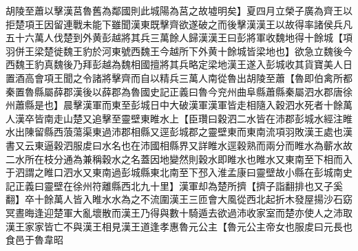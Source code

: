 胡陵至蕭以擊漢莒魯舊為鄰國則此城陽為莒之故墟明矣】夏四月立榮子廣為齊王以拒楚項王因留連戰未能下雖聞漢東既擊齊欲遂破之而後擊漢漢王以故得率諸侯兵凡五十六萬人伐楚到外黄彭越將其兵三萬餘人歸漢漢王曰彭將軍收魏地得十餘城【項羽併王梁楚徙魏王豹於河東號西魏王今越所下外黄十餘城皆梁地也】欲急立魏後今西魏王豹真魏後乃拜彭越為魏相國擅將其兵略定梁地漢王遂入彭城收其貨寶美人日置酒高會項王聞之令諸將擊齊而自以精兵三萬人南從魯出胡陵至蕭【魯即伯禽所都秦置魯縣屬薛郡漢後以薛郡為魯國史記正義曰魯今兖州曲阜縣蕭縣秦屬泗水郡唐徐州蕭縣是也】晨擊漢軍而東至彭城日中大破漢軍漢軍皆走相隨入穀泗水死者十餘萬人漢卒皆南走山楚又追擊至靈壁東睢水上【臣瓚曰穀泗二水皆在沛郡彭城水經注睢水出陳留縣西蒗蕩渠東過沛郡相縣又逕彭城郡之靈壁東而東南流項羽敗漢王處也漢書又云東逼穀泗服䖍曰水名也在沛國相縣界又詳睢水逕穀熟而兩分而睢水為蘄水故二水所在枝分通為兼稱穀水之名蓋因地變然則穀水即睢水也睢水又東南至下相而入于泗謂之睢口泗水又東南過彭城縣東北南至下邳入淮孟康曰靈壁故小縣在彭城南史記正義曰靈壁在徐州符離縣西北九十里】漢軍却為楚所擠【擠子詣翻排也又子奚翻】卒十餘萬人皆入睢水水為之不流圍漢王三匝會大風從西北起折木發屋揚沙石窈冥晝晦逢迎楚軍大亂壞散而漢王乃得與數十騎遁去欲過沛收家室而楚亦使人之沛取漢王家家皆亡不與漢王相見漢王道逢孝惠魯元公主【魯元公主帝女也服䖍曰元長也食邑于魯韋昭